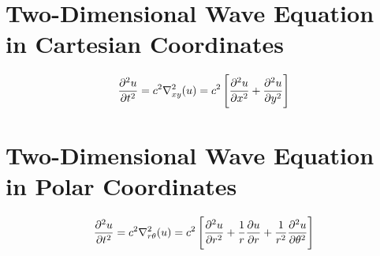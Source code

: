 \documentclass[class=report, 12pt, crop=false]{standalone}
\begin{document}
\begin{center}
\chapter{Two-Dimensional Wave Equation in Cartesian Coordinates}
\begin{comment}
Physics Archives
\end{comment}
$$\frac{\partial^2u}{\partial t^2} = c^2\nabla^2_{xy}(u) = c^2\left[\frac{\partial^2u}{\partial x^2} + \frac{\partial^2u}{\partial y^2}\right]$$
\chapter{Two-Dimensional Wave Equation in Polar Coordinates}
\begin{comment}
Physics Archives
\end{comment}
$$\frac{\partial^2u}{\partial t^2} = c^2\nabla^2_{r\theta}(u) = c^2\left[\frac{\partial^2u}{\partial r^2} + \frac{1}{r}\frac{\partial u}{\partial r} + \frac{1}{r^2}\frac{\partial^2u}{\partial \theta^2}\right]$$
\end{center}
\end{document}
